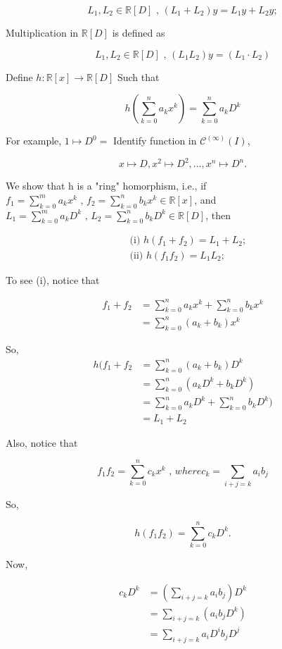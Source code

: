 \documentclass{article}
\theoremstyle{definition}
\begin{document}
\[ L_1, L_2 \in \mathbb{R} [D] \text{ , } (L_1 + L_2)y = L_1y + L_2y ;\]

Multiplication in \( \mathbb{R}[D] \) is defined as 

\[  L_1, L_2 \in \mathbb{R} [D] \text{ , } (L_1  L_2)y =( L_1 \cdot L_2
)\]

Define \( h : \mathbb{R} [x] \to \mathbb{R}[D] \) Such that 

\[ h\left(\sum_{k=0}^n a_k x^k \right) = \sum_{k=0}^n a_k D^k\]

For example,  \( 1 \mapsto D^0 = \) Identify function in \(
\mathscr{C}^{(\infty)} (I) \), 

\[ x \mapsto D, x^2 \mapsto D^2, \dots , x^n \mapsto D^n. \]

We show that h is a "ring" homorphism, i.e., if \( f_1 = \sum_{k=0}^m a_k
x^k \text{ , } f_2 = \sum_{k=0}^n b_k x^k \in \mathbb{R} [x]\), and \( L_1 =
\sum_{k=0}^m a_k D^k \text{ ,  } L_2 = \sum_{k=0}^n b_k D^k \in
\mathbb{R} [D]\), then 

\begin{align*}
  &\text{ (i) } h(f_1 + f_2) = L_1 + L_2; \\
  &\text{ (ii) } h(f_1  f_2) = L_1  L_2; 
\end{align*}

To see (i), notice that 

\begin{align*}
  f_1 + f_2 &= \sum_{k=0}^n a_k x^k + \sum_{k=0}^n b_k x^k \\
  &=  \sum_{k=0}^n (a_k + b_k) x^k
\end{align*}

So, 
\begin{align*}
  h(f_1 +f_2 &=  \sum_{k=0}^n (a_k + b_k) D^k \\
  &=  \sum_{k=0}^n (a_kD^k + b_kD^k) \\
  &=  \sum_{k=0}^n a_kD^k + \sum_{k=0}^n b_kD^k) \\
  &= L_1 + L_2
\end{align*}

Also, notice that

\[ f_1f_2 =  \sum_{k=0}^n c_k x^k \text{ , } where c_k = \sum_{i+j=k}
a_ib_j \]

So, 

\[ h(f_1f_2) = \sum_{k=0}^n c_kD^k. \]

Now, 

\begin{align*}
  c_kD^k &= \left( \sum_{i+j=k} a_ib_j\right) D^k \\
  &= \sum_{i+j=k} (a_ib_jD^k) \\
  &= \sum_{i+j=k} a_iD^ib_jD^j
\end{align*}
\end{document}
